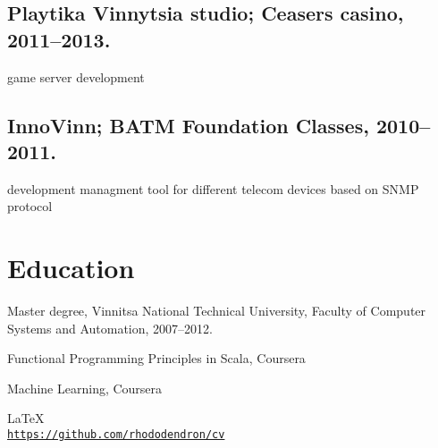 \documentclass[letterpaper]{article}
\def\footerlink{https://github.com/rhododendron/cv}
\renewenvironment{itemize}{
  \begin{list}{}{
    \setlength{\leftmargin}{1.5em}
  }
}{
  \end{list}
}
\begin{document}
\subsection*{Playtika Vinnytsia studio; Ceasers casino, 2011--2013.}

\begin{itemize}
\item game server development
\end{itemize}

\subsection*{InnoVinn; BATM Foundation Classes, 2010--2011.}

\begin{itemize}
\item development managment tool for different telecom devices based on SNMP protocol
\end{itemize}

\section*{Education}

\begin{itemize}
  \item Master degree, Vinnitsa National Technical University, Faculty of Computer 
Systems and Automation, 2007--2012.
  \item Functional Programming Principles in Scala, Coursera
  \item Machine Learning, Coursera
\end{itemize}

\bigskip

\begin{center}
  \begin{footnotesize}
    \LaTeX \\
    \href{\footerlink}{\texttt{\footerlink}}
  \end{footnotesize}
\end{center}
\end{document}
